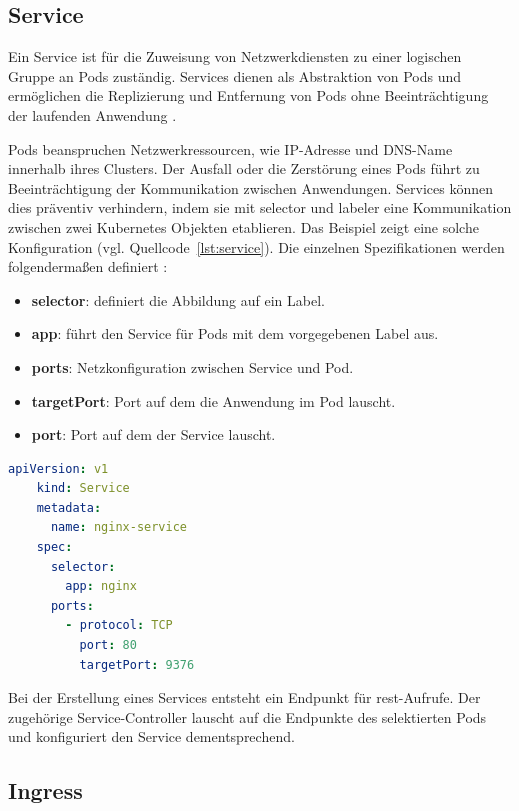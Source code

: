 \subsection{Service}
Ein Service ist für die Zuweisung von Netzwerkdiensten zu einer logischen Gruppe an Pods zuständig.
Services dienen als Abstraktion von Pods und ermöglichen die Replizierung und Entfernung
von Pods ohne Beeinträchtigung der laufenden Anwendung \cite{kubernetesservice}.

Pods beanspruchen Netzwerkressourcen, wie IP-Adresse und DNS-Name 
innerhalb ihres Clusters. Der Ausfall oder die Zerstörung eines Pods führt zu Beeinträchtigung der Kommunikation
zwischen Anwendungen. Services können dies präventiv verhindern, indem sie mit
selector und labeler eine Kommunikation zwischen zwei Kubernetes Objekten etablieren.
Das Beispiel zeigt eine solche Konfiguration (vgl. Quellcode~\ref{lst:service}). 
Die einzelnen Spezifikationen werden folgendermaßen definiert \cite{kubernetesservice}:

\begin{itemize}
  \item \textbf{selector}: definiert die Abbildung auf ein Label.
  \item \textbf{app}: führt den Service für Pods mit dem vorgegebenen Label aus.
  \item \textbf{ports}: Netzkonfiguration zwischen Service und Pod.
  \item \textbf{targetPort}: Port auf dem die Anwendung im Pod lauscht.
  \item \textbf{port}: Port auf dem der Service lauscht.
\end{itemize}

\begin{lstlisting}[caption={service.yaml \cite{kubernetesservice} },captionpos=b,label={lst:service},language=yaml]
    apiVersion: v1
    kind: Service
    metadata:
      name: nginx-service
    spec:
      selector:
        app: nginx
      ports:
        - protocol: TCP
          port: 80
          targetPort: 9376
    \end{lstlisting}


Bei der Erstellung eines Services entsteht ein Endpunkt für \acs{rest}-Aufrufe. 
Der zugehörige Service-Controller lauscht auf die Endpunkte des selektierten Pods und konfiguriert den Service dementsprechend. 


\subsection{Ingress} \label{nginx-ingress}

